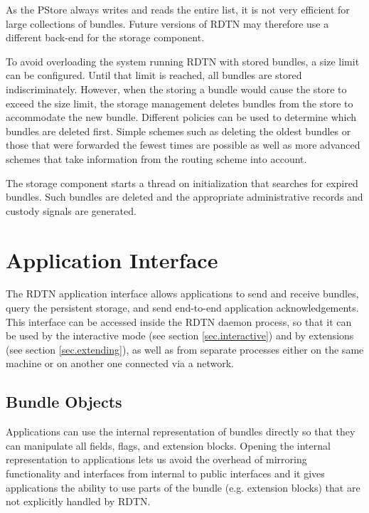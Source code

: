 \documentclass[a4paper]{article}
\begin{document}
As the PStore always writes and reads the entire list, it is not very efficient
for large collections of bundles. Future versions of RDTN may therefore use a
different back-end for the storage component.

To avoid overloading the system running RDTN with stored bundles, a size limit
can be configured. Until that limit is reached, all bundles are stored
indiscriminately. However, when the storing a bundle would cause the store to
exceed the size limit, the storage management deletes
bundles from the store to accommodate the new bundle. Different policies can be
used to determine which bundles are deleted first. Simple schemes such as
deleting the oldest bundles or those that were forwarded the fewest times are
possible as well as more advanced schemes that take information from the routing
scheme into account.

The storage component starts a thread on initialization that searches
for expired bundles. Such bundles are deleted and the appropriate administrative
records and custody signals are generated.

\section{Application Interface}\label{sec.appif}

The RDTN application interface allows applications to send and receive bundles,
query the persistent storage, and send end-to-end application acknowledgements.
This interface can be accessed inside the RDTN daemon process, so that it can be
used by the interactive mode (see section \ref{sec.interactive}) and by
extensions (see section \ref{sec.extending}), as well as from separate processes
either on the same machine or on another one connected via a network.

\subsection{Bundle Objects}\label{sec.bundle-obj}

Applications can use the internal representation of bundles directly so that
they can manipulate all fields, flags, and extension blocks. Opening the
internal representation to applications lets us avoid the overhead of mirroring
functionality and interfaces from internal to public interfaces and it gives
applications the ability to use parts of the bundle (e.g. extension blocks) that
are not explicitly handled by RDTN.
\end{document}
